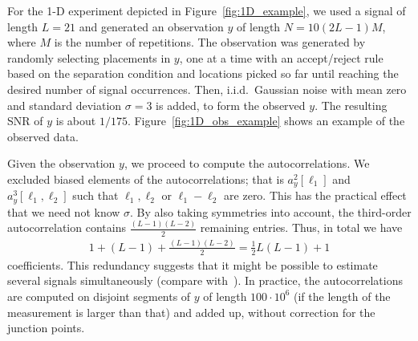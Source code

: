 \documentclass[12pt]{article}
\newcommand{\1}{\mathbf{1}}
\theoremstyle{plain}
\theoremstyle{definition}
\theoremstyle{remark}
\theoremstyle{plain}
\theoremstyle{remark}
\theoremstyle{plain}
\theoremstyle{plain}
\begin{document}
%

For the 1-D experiment depicted in Figure~\ref{fig:1D_example}, we used a signal of length $L=21$ and generated an observation $y$ of length $N = 10(2L-1)M$, where $M$ is the number of repetitions. 
The observation was generated by randomly selecting placements in $y$, one at a time with an accept/reject rule based on the separation condition and locations picked so far until reaching the desired number of signal occurrences. Then, i.i.d.\ Gaussian noise with mean zero and standard deviation $\sigma = 3$ is added, to form the observed $y$. The resulting SNR of $y$ is about $1/175$.
Figure~\ref{fig:1D_obs_example} shows an example of the observed data.

Given the observation $y$, we proceed to compute the autocorrelations.
We excluded biased elements of the autocorrelations; that is $a_y^2[\ell_1]$ and $a_y^3[\ell_1, \ell_2]$ such that $\ell_1, \ell_2$ or $\ell_1 - \ell_2$ are zero. 
This has the  practical effect that we need not know $\sigma$. 
By also taking symmetries into account, the third-order autocorrelation contains $\frac{(L-1)(L-2)}{2}$ remaining entries. Thus, in total we have
\begin{align*}
1 + (L-1) + \frac{(L-1)(L-2)}{2} = \frac{1}{2} L (L-1) + 1
\end{align*}
coefficients. 
This redundancy suggests that it might be possible to estimate several signals simultaneously (compare with~\cite{boumal2017heterogeneous,bandeira2017estimation}).
In practice, the autocorrelations are computed on disjoint segments of $y$ of length $100\cdot10^6$ (if the length of the measurement is larger than that) and added up, without correction for the junction points. 
\end{document}
